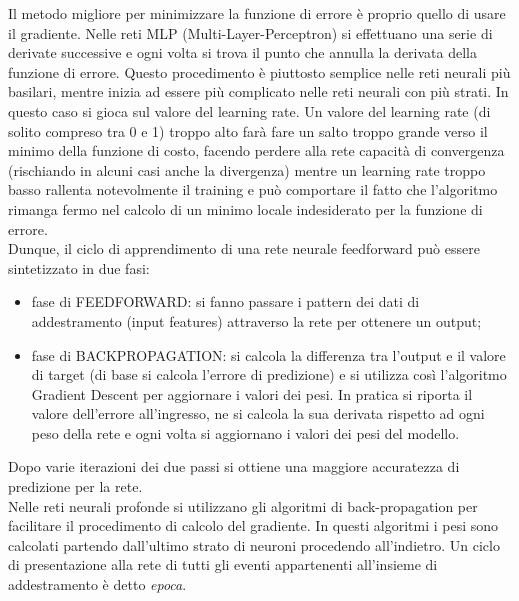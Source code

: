  Il metodo migliore per minimizzare la funzione di errore è proprio quello di usare il gradiente.
 Nelle reti MLP (Multi-Layer-Perceptron) si effettuano una serie di derivate successive e
  ogni volta si trova il punto che annulla la derivata della funzione di errore. Questo procedimento è 
  piuttosto semplice nelle reti neurali più basilari, mentre inizia ad essere più complicato
   nelle reti neurali con più strati. In questo caso si gioca sul valore del learning rate.
   Un valore del learning rate (di solito compreso tra 0 e 1) troppo alto farà fare un
    salto troppo grande verso il minimo della funzione di costo, 
   facendo perdere alla rete capacità di convergenza (rischiando in alcuni casi anche la divergenza) mentre un learning rate troppo basso rallenta
    notevolmente il training e può comportare il fatto che l'algoritmo rimanga fermo nel 
    calcolo di un minimo locale indesiderato per la funzione di errore. \\
   

Dunque, il ciclo di apprendimento di una rete neurale feedforward può essere sintetizzato in due fasi:
\begin{itemize}
\item fase di FEEDFORWARD: si fanno passare i pattern dei dati di addestramento (input features) 
attraverso la rete per ottenere un output;\\
\item fase di BACKPROPAGATION: si calcola la differenza tra l'output e il valore di
  target (di base si calcola l’errore di predizione) e si utilizza così l’algoritmo Gradient Descent 
  per aggiornare i valori dei pesi. In pratica si riporta il valore dell’errore all’ingresso, 
  ne si calcola la sua derivata rispetto ad ogni peso della rete e ogni volta si aggiornano i
   valori dei pesi del modello. 
\end{itemize}
 Dopo varie iterazioni dei due passi si ottiene una maggiore accuratezza di predizione per la rete. \\ 
 Nelle reti neurali profonde si utilizzano gli algoritmi di 
 back-propagation per facilitare il procedimento di calcolo del gradiente. In questi algoritmi
  i pesi sono calcolati partendo dall’ultimo strato di neuroni procedendo all’indietro.
   Un ciclo di presentazione alla rete di tutti gli eventi appartenenti all’insieme di 
   addestramento è detto \emph{epoca}. \\
 
